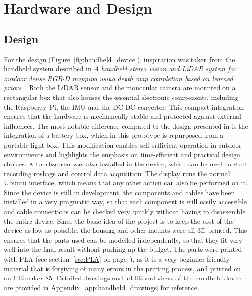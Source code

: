 \documentclass[english, bachelor, utf8]{base/thesis_telematics}
\begin{document}
\chapter{Hardware and Design}
\section{Design}

For the design (Figure~\ref{fig:handheld_device}), inspiration was taken from the handheld system 
described in \textit{A handheld stereo vision and LiDAR system for outdoor dense RGB-D mapping 
using depth map completion based on learned priors}~\cite{bleier2024}. Both the LiDAR sensor and 
the monocular camera are mounted on a rectangular box that also houses the essential electronic 
components, including the Raspberry~Pi, the IMU and the DC-DC converter. This compact integration 
ensures that the hardware is mechanically stable and protected against external influences. The 
most notable difference compared to the design presented in \cite{bleier2024} is the integration of 
a battery box, which in this prototype is repurposed from a portable light box. This modification 
enables self-sufficient operation in outdoor environments and highlights the emphasis on 
time-efficient and practical design choices.
A touchscreen was also installed in
the device, which can be used to start recording rosbags and control data acquisition. The display runs
the normal Ubuntu interface, which means that any other action can also be performed on it. Since the device is
still in development, the components and cables have been installed in a very pragmatic way, so that each component
is still easily accessible and cable connections can be checked very quickly without having to disassemble the
entire device.
Since the basic idea of the project is to keep the cost of the device as low as possible,
the housing and other mounts were all 3D printed. This ensures
that the parts used can be modelled independently, so that they fit
very well into the final result without pushing up the budget. 
The parts were printed with PLA (see section~\ref{sec:PLA} on page~\pageref{sec:PLA}), as it is a very beginner-friendly
material that is forgiving of many errors in the printing process, and printed on an Ultimaker S5.
Detailed drawings and additional views of the handheld device are provided in 
Appendix~\ref{app:handheld_drawings} for reference.
\end{document}
